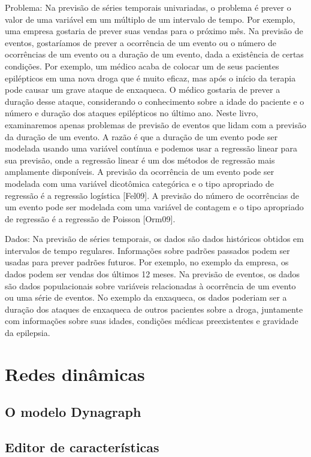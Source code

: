 Problema: Na previsão de séries temporais univariadas, o problema é prever o valor de uma variável em um múltiplo de um intervalo de tempo. Por exemplo, uma empresa gostaria de prever suas vendas para o próximo mês. Na previsão de eventos, gostaríamos de prever a ocorrência de um evento ou o número de ocorrências de um evento ou a duração de um evento, dada a existência de certas condições. Por exemplo, um médico acaba de colocar um de seus pacientes epilépticos em uma nova droga que é muito eficaz, mas após o início da terapia pode causar um grave ataque de enxaqueca. O médico gostaria de prever a duração desse ataque, considerando o conhecimento sobre a idade do paciente e o número e duração dos ataques epilépticos no último ano. Neste livro, examinaremos apenas problemas de previsão de eventos que lidam com a previsão da duração de um evento. A razão é que a duração de um evento pode ser modelada usando uma variável contínua e podemos usar a regressão linear para sua previsão, onde a regressão linear é um dos métodos de regressão mais amplamente disponíveis. A previsão da ocorrência de um evento pode ser modelada com uma variável dicotômica categórica e o tipo apropriado de regressão é a regressão logística [Fel09]. A previsão do número de ocorrências de um evento pode ser modelada com uma variável de contagem e o tipo apropriado de regressão é a regressão de Poisson [Orm09].

Dados: Na previsão de séries temporais, os dados são dados históricos obtidos em intervalos de tempo regulares. Informações sobre padrões passados podem ser usadas para prever padrões futuros. Por exemplo, no exemplo da empresa, os dados podem ser vendas dos últimos 12 meses. Na previsão de eventos, os dados são dados populacionais sobre variáveis relacionadas à ocorrência de um evento ou uma série de eventos. No exemplo da enxaqueca, os dados poderiam ser a duração dos ataques de enxaqueca de outros pacientes sobre a droga, juntamente com informações sobre suas idades, condições médicas preexistentes e gravidade da epilepsia.

\section{Redes dinâmicas}
 \label{redes-dinamicas} 
\subsection{O modelo Dynagraph}
\subsection{Editor de características}
